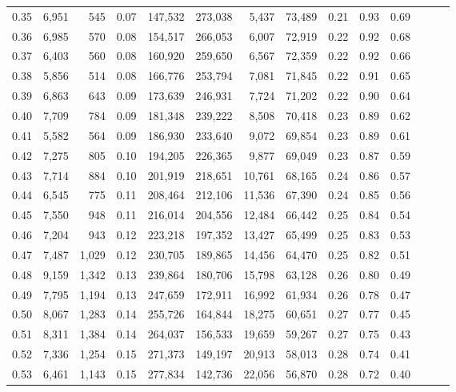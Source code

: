 \begin{tabular}{rrrrrrrrrrrrrr}
0.35 &  6,951 &    545 &  0.07 &  147,532 &  273,038 &   5,437 &  73,489 &  0.21 &  0.93 &      0.69 \\
0.36 &  6,985 &    570 &  0.08 &  154,517 &  266,053 &   6,007 &  72,919 &  0.22 &  0.92 &      0.68 \\
0.37 &  6,403 &    560 &  0.08 &  160,920 &  259,650 &   6,567 &  72,359 &  0.22 &  0.92 &      0.66 \\
0.38 &  5,856 &    514 &  0.08 &  166,776 &  253,794 &   7,081 &  71,845 &  0.22 &  0.91 &      0.65 \\
0.39 &  6,863 &    643 &  0.09 &  173,639 &  246,931 &   7,724 &  71,202 &  0.22 &  0.90 &      0.64 \\
0.40 &  7,709 &    784 &  0.09 &  181,348 &  239,222 &   8,508 &  70,418 &  0.23 &  0.89 &      0.62 \\
0.41 &  5,582 &    564 &  0.09 &  186,930 &  233,640 &   9,072 &  69,854 &  0.23 &  0.89 &      0.61 \\
0.42 &  7,275 &    805 &  0.10 &  194,205 &  226,365 &   9,877 &  69,049 &  0.23 &  0.87 &      0.59 \\
0.43 &  7,714 &    884 &  0.10 &  201,919 &  218,651 &  10,761 &  68,165 &  0.24 &  0.86 &      0.57 \\
0.44 &  6,545 &    775 &  0.11 &  208,464 &  212,106 &  11,536 &  67,390 &  0.24 &  0.85 &      0.56 \\
0.45 &  7,550 &    948 &  0.11 &  216,014 &  204,556 &  12,484 &  66,442 &  0.25 &  0.84 &      0.54 \\
0.46 &  7,204 &    943 &  0.12 &  223,218 &  197,352 &  13,427 &  65,499 &  0.25 &  0.83 &      0.53 \\
0.47 &  7,487 &  1,029 &  0.12 &  230,705 &  189,865 &  14,456 &  64,470 &  0.25 &  0.82 &      0.51 \\
0.48 &  9,159 &  1,342 &  0.13 &  239,864 &  180,706 &  15,798 &  63,128 &  0.26 &  0.80 &      0.49 \\
0.49 &  7,795 &  1,194 &  0.13 &  247,659 &  172,911 &  16,992 &  61,934 &  0.26 &  0.78 &      0.47 \\
0.50 &  8,067 &  1,283 &  0.14 &  255,726 &  164,844 &  18,275 &  60,651 &  0.27 &  0.77 &      0.45 \\
0.51 &  8,311 &  1,384 &  0.14 &  264,037 &  156,533 &  19,659 &  59,267 &  0.27 &  0.75 &      0.43 \\
0.52 &  7,336 &  1,254 &  0.15 &  271,373 &  149,197 &  20,913 &  58,013 &  0.28 &  0.74 &      0.41 \\
0.53 &  6,461 &  1,143 &  0.15 &  277,834 &  142,736 &  22,056 &  56,870 &  0.28 &  0.72 &      0.40 \\

\end{tabular}
